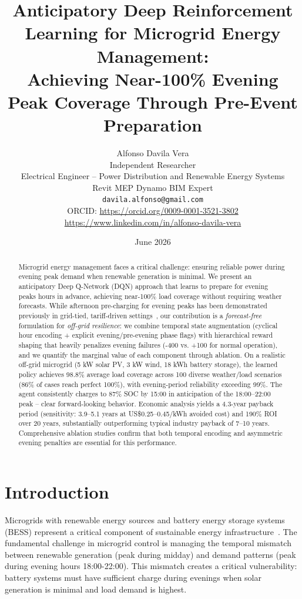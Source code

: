 \documentclass[11pt,a4paper]{article}
\title{Anticipatory Deep Reinforcement Learning for Microgrid Energy Management:\\ Achieving Near-100\% Evening Peak Coverage Through Pre-Event Preparation}
\author{
  Alfonso Davila Vera \\
  Independent Researcher \\
  Electrical Engineer -- Power Distribution and Renewable Energy Systems \\
  Revit MEP Dynamo BIM Expert \\
  \texttt{davila.alfonso@gmail.com} \\
  ORCID: \url{https://orcid.org/0009-0001-3521-3802} \\
  \url{https://www.linkedin.com/in/alfonso-davila-vera}
}
\date{June 2026}
\begin{document}
\maketitle

\begin{abstract}
Microgrid energy management faces a critical challenge: ensuring reliable power during evening peak demand when renewable generation is minimal. We present an anticipatory Deep Q-Network (DQN) approach that learns to prepare for evening peaks hours in advance, achieving near-100\% load coverage without requiring weather forecasts. While afternoon pre-charging for evening peaks has been demonstrated previously in grid-tied, tariff-driven settings~\cite{muriithi2022}, our contribution is a \emph{forecast-free} formulation for \emph{off-grid resilience}: we combine temporal state augmentation (cyclical hour encoding + explicit evening/pre-evening phase flags) with hierarchical reward shaping that heavily penalizes evening failures (-400 vs. +100 for normal operation), and we quantify the marginal value of each component through ablation. On a realistic off-grid microgrid (5 kW solar PV, 3 kW wind, 18 kWh battery storage), the learned policy achieves 98.8\% average load coverage across 100 diverse weather/load scenarios (86\% of cases reach perfect 100\%), with evening-period reliability exceeding 99\%. The agent consistently charges to 87\% SOC by 15:00 in anticipation of the 18:00--22:00 peak -- clear forward-looking behavior. Economic analysis yields a 4.3-year payback period (sensitivity: 3.9--5.1 years at US\$0.25--0.45/kWh avoided cost) and 190\% ROI over 20 years, substantially outperforming typical industry payback of 7--10 years. Comprehensive ablation studies confirm that both temporal encoding and asymmetric evening penalties are essential for this performance.
\end{abstract}

\section{Introduction}

Microgrids with renewable energy sources and battery energy storage systems (BESS) represent a critical component of sustainable energy infrastructure~\cite{lasseter2011}. The fundamental challenge in microgrid control is managing the temporal mismatch between renewable generation (peak during midday) and demand patterns (peak during evening hours 18:00-22:00). This mismatch creates a critical vulnerability: battery systems must have sufficient charge during evenings when solar generation is minimal and load demand is highest.
\end{document}
